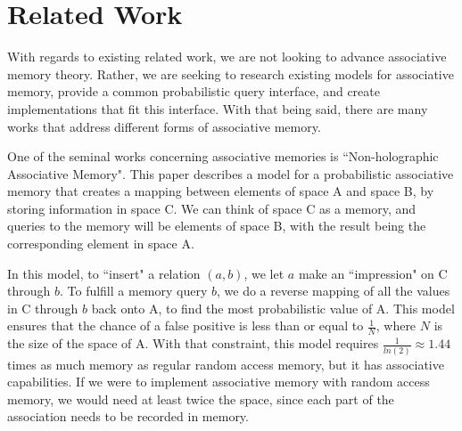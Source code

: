 \documentclass{sig-alternate}
\begin{document}
%


\section{Related Work}
\label{sec:related_work}

With regards to existing related work, we are not looking to
advance associative memory theory. Rather, we are seeking to research existing
models for associative memory, provide a common probabilistic query interface, and create 
implementations that fit this interface. With that being said, there are many works that 
address different forms of associative memory. 

One of the seminal works concerning associative memories is ``Non-holographic
Associative Memory". This paper describes a model for a probabilistic associative memory
that creates a mapping between elements of space A and space B, by storing information
in space C. We can think of space C as a memory, and queries to the memory will be elements
of space B, with the result being the corresponding element in space A.

In this model, to ``insert" a relation $(a, b)$, we let $a$ make an ``impression" on C through $b$.
To fulfill a memory query $b$, we do a reverse mapping of all the values in C through $b$
back onto A, to find the most probabilistic value of A.
This model ensures that the chance of a false positive is less than or equal to $\frac{1}{N}$, where $N$
is the size of the space of A. With that constraint, this model requires $\frac{1}{ln(2)} \approx 1.44$
times as much memory as regular random access memory, but it has associative capabilities. 
If we were to implement associative memory with random access memory, we would need at least twice the space,
since each part of the association needs to be recorded in memory.
\end{document}
